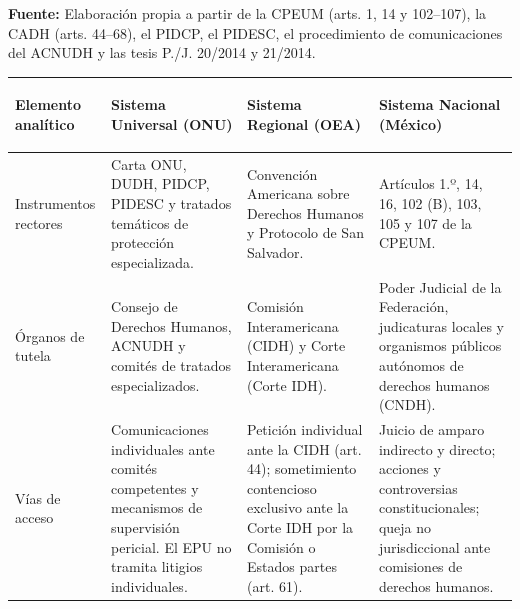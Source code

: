 \documentclass[12pt,spanish,letterpaper,oneside]{article}
\begin{document}
\begin{landscape}
{
}
\par\vspace{3pt}
{\footnotesize\raggedright\textbf{Fuente:} Elaboraci\'on propia a partir de la CPEUM (arts. 1, 14 y 102--107), la CADH (arts. 44--68), el PIDCP, el PIDESC, el procedimiento de comunicaciones del ACNUDH y las tesis P./J. 20/2014 y 21/2014.\par}

\clearpage

\centering
{}\label{tab:matrizSistemas}
\vspace{3pt}
\begingroup
\scriptsize
\setlength{\tabcolsep}{4pt}
\renewcommand{\arraystretch}{1.22}
\begin{tabularx}{0.96\linewidth}{>{\bfseries\raggedright\arraybackslash}p{2.6cm} *{3}{>{\raggedright\arraybackslash}X}}
\toprule
\rowcolor{tableHeader}
Elemento anal\'itico & Sistema Universal (ONU) & Sistema Regional (OEA) & Sistema Nacional (M\'exico) \\
\midrule
Instrumentos rectores & Carta ONU, DUDH, PIDCP, PIDESC y tratados tem\'aticos de protecci\'on especializada. & Convenci\'on Americana sobre Derechos Humanos y Protocolo de San Salvador. & Art\'iculos 1.º, 14, 16, 102 (B), 103, 105 y 107 de la CPEUM. \\
\addlinespace
\'Organos de tutela & Consejo de Derechos Humanos, ACNUDH y comit\'es de tratados especializados. & Comisi\'on Interamericana (CIDH) y Corte Interamericana (Corte IDH). & Poder Judicial de la Federaci\'on, judicaturas locales y organismos p\'ublicos aut\'onomos de derechos humanos (CNDH). \\
\addlinespace
V\'ias de acceso & Comunicaciones individuales ante comit\'es competentes y mecanismos de supervisi\'on pericial. El EPU no tramita litigios individuales. & Petici\'on individual ante la CIDH (art. 44); sometimiento contencioso exclusivo ante la Corte IDH por la Comisi\'on o Estados partes (art. 61). & Juicio de amparo indirecto y directo; acciones y controversias constitucionales; queja no jurisdiccional ante comisiones de derechos humanos. \\

\end{tabularx}
\end{landscape}
\end{document}
